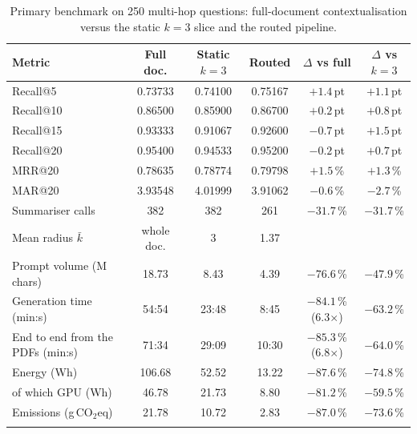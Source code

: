 \documentclass[pdflatex,sn-mathphys-num]{sn-jnl}
\makeatletter
\newcommand{\gco}{g\,CO$_2$eq}
\newcommand{\Rec}[1]{Recall@#1}
\newcommand{\MRR}[1]{MRR@#1}
\newcommand{\MAR}[1]{MAR@#1}
\theoremstyle{thmstyleone}%
\theoremstyle{thmstylethree}%
\makeatother
\begin{document}
\begin{table}[htbp]
\caption{Primary benchmark on 250 multi-hop questions: full-document contextualisation versus the static $k=3$ slice and the routed pipeline.}\label{tab:primary}
\setlength{\tabcolsep}{4pt}
\begin{tabular}{@{}p{3.6cm}ccccc@{}}
\toprule
Metric & Full doc. & Static $k=3$ & Routed & $\Delta$ vs full & $\Delta$ vs $k=3$ \\
\midrule
\Rec{5} & 0.73733 & 0.74100 & 0.75167 & $+1.4$\,pt & $+1.1$\,pt \\
\Rec{10} & 0.86500 & 0.85900 & 0.86700 & $+0.2$\,pt & $+0.8$\,pt \\
\Rec{15} & 0.93333 & 0.91067 & 0.92600 & $-0.7$\,pt & $+1.5$\,pt \\
\Rec{20} & 0.95400 & 0.94533 & 0.95200 & $-0.2$\,pt & $+0.7$\,pt \\
\MRR{20} & 0.78635 & 0.78774 & 0.79798 & $+1.5$\,\% & $+1.3$\,\% \\
\MAR{20} & 3.93548 & 4.01999 & 3.91062 & $-0.6$\,\% & $-2.7$\,\% \\
Summariser calls & 382 & 382 & 261 & $-31.7$\,\% & $-31.7$\,\% \\
Mean radius $\bar k$ & whole doc. & 3 & 1.37 & & \\
Prompt volume (M chars) & 18.73 & 8.43 & 4.39 & $-76.6$\,\% & $-47.9$\,\% \\
Generation time (min:s) & 54:54 & 23:48\footnotemark[1] & 8:45 & $-84.1$\,\% (6.3$\times$) & $-63.2$\,\% \\
End to end from the PDFs (min:s) & 71:34\footnotemark[2] & 29:09\footnotemark[2] & 10:30\footnotemark[2] & $-85.3$\,\% (6.8$\times$) & $-64.0$\,\% \\
Energy (Wh) & 106.68 & 52.52\footnotemark[1] & 13.22 & $-87.6$\,\% & $-74.8$\,\% \\
\quad of which GPU (Wh) & 46.78 & 21.73\footnotemark[1] & 8.80 & $-81.2$\,\% & $-59.5$\,\% \\
Emissions (\gco{}) & 21.78 & 10.72\footnotemark[1] & 2.83 & $-87.0$\,\% & $-73.6$\,\% \\
\botrule
\end{tabular}
\end{table}
\end{document}
